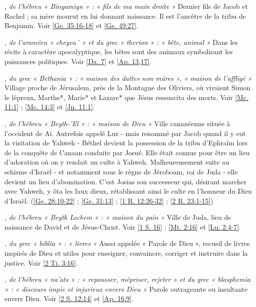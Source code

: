 \begin{multicols}{2}
\textit{, de l'hébreu « Binyamiyn » : « fils de ma main droite »}\newline
Dernier fils de Jacob et Rachel ; sa mère mourut en lui donnant naissance. Il est l'ancêtre de la tribu de Benjamin. Voir \vref{Ge. 35:16-18} et \vref{Ge. 49:27}.

\textit{, de l'araméen « cheyva´ » et du grec « therion » : « bête, animal »}\newline
Dans les récits à caractère apocalyptique, les bêtes sont des animaux symbolisant les puissances politiques. Voir \vref{Da. 7} et \vref{Ap. 13,17}.

\textit{, du grec « Bethania » : « maison des dattes non mûres », « maison de l'affligé »}\newline
Village proche de Jérusalem, près de la Montagne des Oliviers, où vivaient Simon le lépreux, Marthe*, Marie* et Lazare* que Jésus ressuscita des morts. Voir \vref{Mc. 11:1} ; \vref{Mc. 14:3} et \vref{Jn. 11:1}.

\textit{, de l'hébreu « Beyth-'El » : « maison de Dieu »}\newline
Ville cananéenne située à l'occident de Aï. Autrefois appelé Luz - mais renommé par Jacob quand il y eut la visitation de Yahweh - Béthel devient la possession de la tribu d'Ephraïm lors de la conquête de Canaan conduite par Josué. Elle était connue pour être un lieu d'adoration où on y rendait un culte à Yahweh. Malheureusement suite au schisme d'Israël - et notamment sous le règne de Jéroboam, roi de Juda - elle devient un lieu d'abomination. C'est Josias son successeur qui, désirant marcher avec Yahweh, y ôta les faux dieux, rétablissant ainsi le culte en l'honneur du Dieu d'Israël. (\vref{Ge. 28:10-22} ; \vref{Ge. 31:13} ; \vref{1 R. 12:26-32} ; \vref{2 R. 23:1-15})

\textit{, de l'hébreu « Beyth Lechem » : « maison du pain »}\newline
Ville de Juda, lieu de naissance de David et de Jésus-Christ. Voir \vref{1 S. 16} ; \vref{Mt. 2:16} et \vref{Lu. 2:4-7}.

\textit{, du grec « biblia » : « livres »}\newline
Aussi appelée « Parole de Dieu », recueil de livres inspirés de Dieu et utiles pour enseigner, convaincre, corriger et instruire dans la justice. Voir \vref{2 Ti. 3:16}.

\textit{, de l'hébreu « na'ats » : « repousser, mépriser, rejeter » et du grec « blasphemia » : « discours impie et injurieux envers Dieu »}\newline
Parole outrageante ou insultante envers Dieu. Voir \vref{2 S. 12:14} et \vref{Ap. 16:9}.


\end{multicols}
